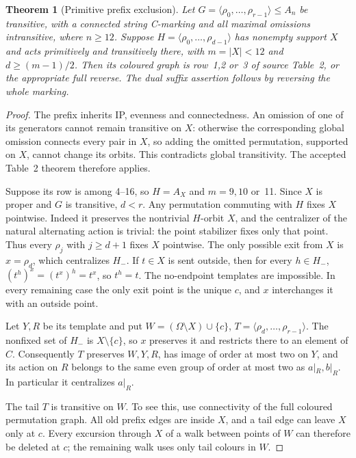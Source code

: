 \documentclass[11pt,a4paper]{article}
\newtheorem{theorem}[lemma]{Theorem}
\newcommand{\gen}[1]{\langle#1\rangle}
\begin{document}
\begin{theorem}[Primitive prefix exclusion]\label{thm:prefix}
Let $G=\gen{\rho_0,\ldots,\rho_{r-1}}\leq A_n$ be transitive,
with a connected string C-marking and all maximal omissions
intransitive, where $n\geq12$. Suppose
$H=\gen{\rho_0,\ldots,\rho_{d-1}}$ has nonempty support $X$ and acts
primitively and transitively there, with $m=|X|<12$ and
$d\geq(m-1)/2$. Then its coloured graph is row~1,2 or~3 of
source Table~2, or the appropriate full reverse. The dual
suffix assertion follows by reversing the whole marking.
\end{theorem}
\begin{proof}
The prefix inherits IP, evenness and connectedness. An omission
of one of its generators cannot remain transitive on $X$:
otherwise the corresponding global omission connects every
pair in $X$, so adding the omitted permutation, supported on
$X$, cannot change its orbits. This contradicts global
transitivity. The accepted Table~2 theorem therefore applies.

Suppose its row is among 4--16, so $H=A_X$ and $m=9,10$ or~11.
Since $X$ is proper and $G$ is transitive, $d<r$.
Any permutation commuting with $H$ fixes $X$ pointwise. Indeed
it preserves the nontrivial $H$-orbit $X$, and the centralizer
of the natural alternating action is trivial: the point
stabilizer fixes only that point. Thus every $\rho_j$ with
$j\geq d+1$ fixes $X$ pointwise. The only possible exit from
$X$ is $x=\rho_d$, which centralizes $H_-$. If $t\in X$ is
sent outside, then for every $h\in H_-$,
$(t^h)^x=(t^x)^h=t^x$, so $t^h=t$. The no-endpoint templates
are impossible. In every remaining case the only exit point
is the unique $c$, and $x$ interchanges it with an outside point.

Let $Y,R$ be its template and put
$W=(\Omega\setminus X)\cup\{c\}$,
$T=\gen{\rho_d,\ldots,\rho_{r-1}}$.
The nonfixed set of $H_-$ is $X\setminus\{c\}$, so $x$
preserves it and restricts there to an element of $C$.
Consequently $T$ preserves $W,Y,R$, has image of order at most
two on $Y$, and its action on $R$ belongs to the same even
group of order at most two as $a|_R,b|_R$. In particular it
centralizes $a|_R$.

The tail $T$ is transitive on $W$. To see this, use connectivity
of the full coloured permutation graph. All old prefix edges
are inside $X$, and a tail edge can leave $X$ only at $c$.
Every excursion through $X$ of a walk between points of $W$
can therefore be deleted at $c$; the remaining walk uses only
tail colours in $W$.


\end{proof}
\end{document}
